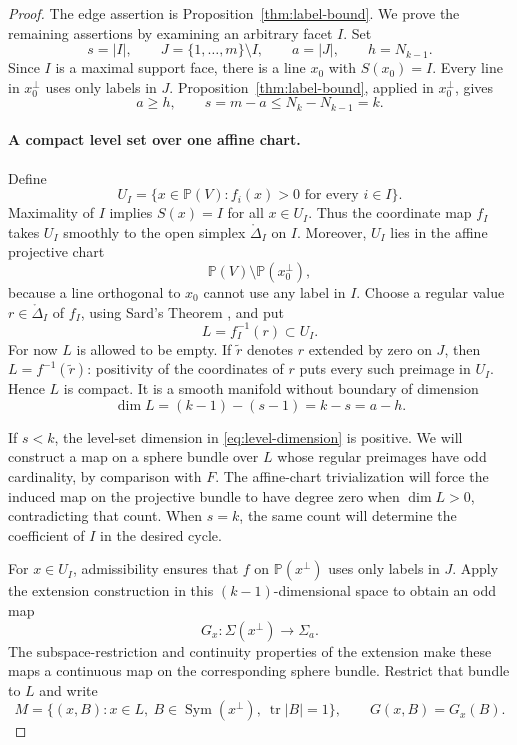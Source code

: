 \begin{proof}
The edge assertion is Proposition~\ref{thm:label-bound}.  We prove
the remaining assertions by examining an arbitrary facet $I$.
Set
\[
 s=|I|,\qquad J=\{1,\ldots,m\}\setminus I,\qquad
 a=|J|,\qquad h=N_{k-1}.
\]
Since $I$ is a maximal support face, there is a line $x_0$ with
$S(x_0)=I$.  Every line in $x_0^\perp$ uses only labels in $J$.
Proposition~\ref{thm:label-bound}, applied in $x_0^\perp$, gives
\begin{equation}\label{eq:facet-size-upper}
 a\ge h,\qquad s=m-a\le N_k-N_{k-1}=k.
\end{equation}

\paragraph{A compact level set over one affine chart.}
Define
\[
 U_I=\{x\in\mathbb P(V):f_i(x)>0\text{ for every }i\in I\}.
\]
Maximality of $I$ implies $S(x)=I$ for all $x\in U_I$.  Thus the
coordinate map $f_I$ takes $U_I$ smoothly to the open simplex
$\mathring\Delta_I$ on $I$.  Moreover, $U_I$ lies in the affine
projective chart
\[
 \mathbb P(V)\setminus\mathbb P(x_0^\perp),
\]
because a line orthogonal to $x_0$ cannot use any label in $I$.
Choose a regular value $r\in\mathring\Delta_I$ of $f_I$, using
Sard's Theorem \cite[Theorem~6.10]{Lee2013}, and put
\[
 L=f_I^{-1}(r)\subset U_I.
\]
For now $L$ is allowed to be empty.  If $\widetilde r$ denotes $r$
extended by zero on $J$, then
$L=f^{-1}(\widetilde r)$: positivity of the coordinates of $r$
puts every such preimage in $U_I$.  Hence $L$ is compact.  It is a
smooth manifold without boundary \cite[Corollary~5.14]{Lee2013} of dimension
\begin{equation}\label{eq:level-dimension}
 \dim L=(k-1)-(s-1)=k-s=a-h.
\end{equation}

If $s<k$, the level-set dimension in \eqref{eq:level-dimension} is positive.
We will construct a map on a sphere bundle over $L$ whose regular
preimages have odd cardinality, by comparison with $F$. The affine-chart
trivialization will force the induced map on the projective bundle to
have degree zero when $\dim L>0$, contradicting that count. When $s=k$,
the same count will determine the coefficient of $I$ in the desired cycle.

For $x\in U_I$, admissibility ensures that $f$ on
$\mathbb P(x^\perp)$ uses only labels in $J$.  Apply the extension
construction in this $(k-1)$-dimensional space to obtain an odd map
\[
 G_x:\Sigma(x^\perp)\longrightarrow\Sigma_a.
\]
The subspace-restriction and continuity properties of the extension
make these maps a continuous map on the corresponding sphere bundle.
Restrict that bundle to $L$ and write
\[
 M=\{(x,B):x\in L,\ B\in\operatorname{Sym}(x^\perp),
                     \ \operatorname{tr}|B|=1\},
 \qquad G(x,B)=G_x(B).
\]


\end{proof}

